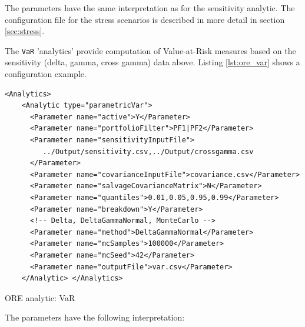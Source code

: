 \documentclass[12pt, a4paper]{article}
\begin{document}
{The parameters have the same interpretation as for the sensitivity analytic. The configuration file for the stress
scenarios is described in more detail in section \ref{sec:stress}.

\medskip The {\tt VaR} 'analytics' provide computation of Value-at-Risk measures based on the sensitivity (delta, gamma, cross gamma) data above. Listing \ref{lst:ore_var} shows a configuration example.

\begin{listing}[H]
\begin{verbatim}
<Analytics>
    <Analytic type="parametricVar"> 
      <Parameter name="active">Y</Parameter> 
      <Parameter name="portfolioFilter">PF1|PF2</Parameter>
      <Parameter name="sensitivityInputFile">
         ../Output/sensitivity.csv,../Output/crossgamma.csv
      </Parameter> 
      <Parameter name="covarianceInputFile">covariance.csv</Parameter> 
      <Parameter name="salvageCovarianceMatrix">N</Parameter>
      <Parameter name="quantiles">0.01,0.05,0.95,0.99</Parameter> 
      <Parameter name="breakdown">Y</Parameter> 
      <!-- Delta, DeltaGammaNormal, MonteCarlo --> 
      <Parameter name="method">DeltaGammaNormal</Parameter> 
      <Parameter name="mcSamples">100000</Parameter> 
      <Parameter name="mcSeed">42</Parameter> 
      <Parameter name="outputFile">var.csv</Parameter> 
    </Analytic> </Analytics>
\end{verbatim}
\caption{ORE analytic: VaR}
\label{lst:ore_var}
\end{listing}

The parameters have the following interpretation:

}
\end{document}

